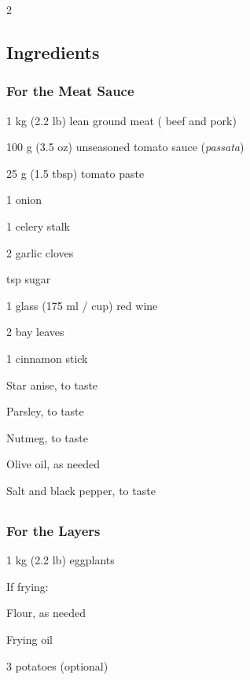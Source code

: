 \newpage
{}

\begin{multicols}{2}
	\subsection*{Ingredients}
	
	\subsubsection*{For the Meat Sauce}
	\begin{ingredients}
		\item 1 kg (2.2 lb) lean ground meat ( beef and  pork)
		\item 100 g (3.5 oz) unseasoned tomato sauce (\textit{passata})
		\item 25 g (1.5 tbsp) tomato paste
		\item 1 onion
		\item 1 celery stalk
		\item 2 garlic cloves
		\item {} tsp sugar
		\item 1 glass (175 ml /  cup) red wine
		\item 2 bay leaves
		\item 1 cinnamon stick
		\item Star anise, to taste
		\item Parsley, to taste
		\item Nutmeg, to taste
		\item Olive oil, as needed
		\item Salt and black pepper, to taste
	\end{ingredients}
	\subsection*{ }
	\subsubsection*{For the Layers}
	\begin{ingredients}
		\item 1 kg (2.2 lb) eggplants
		\item If frying:
		\begin{ingredients}
			\item Flour, as needed
			\item Frying oil
		\end{ingredients}
		\item 3 potatoes (optional)
	\end{ingredients}
	

\end{multicols}
